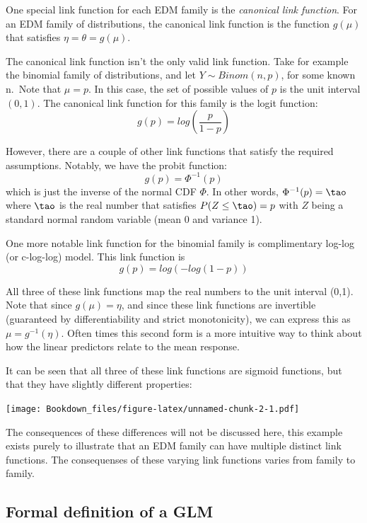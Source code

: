\documentclass[
]{book}
\begin{document}
One special link function for each EDM family is the \emph{canonical link function}. For an EDM family of distributions, the canonical link function is the function \(g(\mu)\) that satisfies \(\eta=\theta=g(\mu)\).

The canonical link function isn't the only valid link function. Take for example the binomial family of distributions, and let \(Y\sim Binom(n,p)\), for some known n.~Note that \(\mu = p\). In this case, the set of possible values of \(p\) is the unit interval \((0,1)\). The canonical link function for this family is the logit function:
\[
g(p) = log\left(\frac{p}{1-p}\right)
\]

However, there are a couple of other link functions that satisfy the required assumptions. Notably, we have the probit function:
\[
g(p)=\Phi^{-1}(p)
\]
which is just the inverse of the normal CDF \(\Phi\). In other words, \(\Phi^{-1}(p) = \tao\) where \(\tao\) is the real number that satisfies \(P(Z\leq\tao)=p\) with \(Z\) being a standard normal random variable (mean 0 and variance 1).

One more notable link function for the binomial family is complimentary log-log (or c-log-log) model. This link function is
\[
g(p) = log(-log(1-p))
\]

All three of these link functions map the real numbers to the unit interval (0,1). Note that since \(g(\mu)=\eta\), and since these link functions are invertible (guaranteed by differentiability and strict monotonicity), we can express this as \(\mu = g^{-1}(\eta)\). Often times this second form is a more intuitive way to think about how the linear predictors relate to the mean response.

It can be seen that all three of these link functions are sigmoid functions, but that they have slightly different properties:

\texttt{[image: Bookdown\_files/figure-latex/unnamed-chunk-2-1.pdf]}

The consequences of these differences will not be discussed here, this example exists purely to illustrate that an EDM family can have multiple distinct link functions. The consequenses of these varying link functions varies from family to family.

\hypertarget{formal-definition-of-a-glm}{%
\subsection{Formal definition of a GLM}\label{formal-definition-of-a-glm}}
\end{document}
